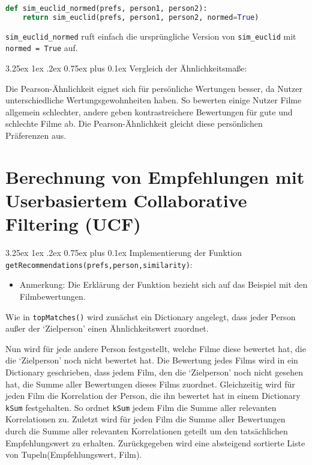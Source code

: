 \documentclass[12pt,a4paper]{scrartcl}
\makeatletter
\renewcommand\subparagraph{\@startsection{subparagraph}{5}{\parindent}%
    {3.25ex \@plus1ex \@minus .2ex}%
    {0.75ex plus 0.1ex}%
    {\normalfont\normalsize\bfseries}}
\makeatother
\begin{document}
\begin{lstlisting}[language=Python]
def sim_euclid_normed(prefs, person1, person2):
    return sim_euclid(prefs, person1, person2, normed=True)
\end{lstlisting}

\lstinline{sim_euclid_normed} ruft einfach die urspr\"ungliche Version von \lstinline{sim_euclid} mit \lstinline{normed = True} auf. 



\subparagraph{Vergleich der \"Ahnlichkeitsma\ss e:}

Die Pearson-\"Ahnlichkeit eignet sich f\"ur pers\"onliche Wertungen besser, da Nutzer unterschiedliche Wertungsgewohnheiten haben. So bewerten einige Nutzer Filme allgemein schlechter, andere geben kontrastreichere Bewertungen f\"ur gute und schlechte Filme ab. Die Pearson-\"Ahnlichkeit gleicht diese pers\"onlichen Pr\"aferenzen aus.


\section*{Berechnung von Empfehlungen mit Userbasiertem Collaborative Filtering (UCF)}
\subparagraph{Implementierung der Funktion \lstinline{getRecommendations(prefs,person,similarity)}:}
\begin{itemize}
\item Anmerkung: Die Erkl\"arung der Funktion bezieht sich auf das Beispiel mit den Filmbewertungen.
\end{itemize}


Wie in \lstinline{topMatches()}  wird zun\"achst ein Dictionary angelegt, dass jeder Person au\ss er der `Zielperson' einen \"Ahnlichkeitswert zuordnet.

Nun wird f\"ur jede andere Person festgestellt, welche Filme diese bewertet hat, die die `Zielperson' noch nicht bewertet hat. Die Bewertung jedes Films wird in ein Dictionary geschrieben, dass jedem Film, den die `Zielperson' noch nicht gesehen hat, die Summe aller Bewertungen dieses Films zuordnet.
Gleichzeitig wird f\"ur jeden Film die Korrelation der Person, die ihn bewertet hat in einem Dictionary \lstinline{kSum} festgehalten. So ordnet \lstinline{kSum} jedem Film die Summe aller relevanten Korrelationen zu.
Zuletzt wird f\"ur jeden Film die Summe aller Bewertungen durch die Summe aller relevanten Korrelationen geteilt um den tats\"achlichen Empfehlungswert zu erhalten.
Zur\"uckgegeben wird eine absteigend sortierte Liste von Tupeln(Empfehlungswert, Film).
\end{document}
